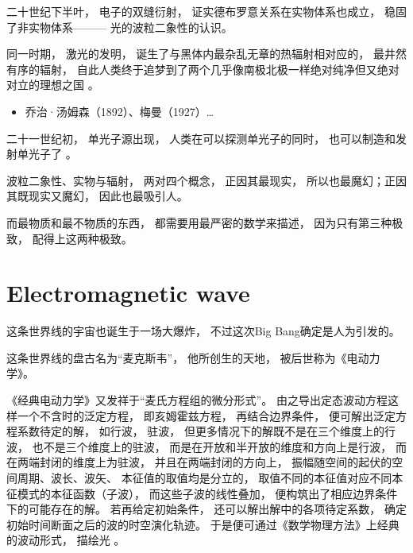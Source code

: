 二十世纪下半叶， 电子的双缝衍射， 证实德布罗意关系在实物体系也成立， 稳固了非实物体系———
光的波粒二象性的认识。

同一时期， 激光的发明， 诞生了与黑体内最杂乱无章的热辐射相对应的， 最井然有序的辐射，
自此人类终于追梦到了两个几乎像南极北极一样绝对纯净但又绝对对立的理想之国
。

\begin{itemize}[noitemsep,leftmargin=20pt]
	\item 乔治·汤姆森（1892）、梅曼（1927）\dots
\end{itemize}

二十一世纪初， 单光子源出现， 人类在可以探测单光子的同时， 也可以制造和发射单光子了
。

波粒二象性、实物与辐射， 两对四个概念， 正因其最现实， 所以也最魔幻；正因其既现实又魔幻， 因此也最吸引人。

而最物质和最不物质的东西， 都需要用最严密的数学来描述， 因为只有第三种极致， 配得上这两种极致。

\section{Electromagnetic wave}

这条世界线的宇宙也诞生于一场大爆炸， 不过这次Big Bang确定是人为引发的。

这条世界线的盘古名为“麦克斯韦”， 他所创生的天地， 被后世称为《电动力学》。

《经典电动力学》又发祥于“麦氏方程组的微分形式”。 由之导出定态波动方程这样一个不含时的泛定方程，
即亥姆霍兹方程， 再结合边界条件， 便可解出泛定方程系数待定的解， 如行波， 驻波，
但更多情况下的解既不是在三个维度上的行波， 也不是三个维度上的驻波， 而是在开放和半开放的维度和方向上是行波，
而在两端封闭的维度上为驻波， 并且在两端封闭的方向上， 振幅随空间的起伏的空间周期、波长、波矢、
本征值的取值均是分立的， 取值不同的本征值对应不同本征模式的本征函数（子波）， 而这些子波的线性叠加，
便构筑出了相应边界条件下的可能存在的解。 若再给定初始条件， 还可以解出解中的各项待定系数，
确定初始时间断面之后的波的时空演化轨迹。 于是便可通过《数学物理方法》上经典的波动形式， 描绘光
。

